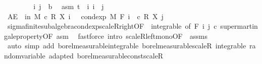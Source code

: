 \begin{isabellebody}
%
\isadelimproof
%
\endisadelimproof
%
\isatagproof
{}\isamarkupfalse%
\isanewline
\ \ \isacommand{{\isacharbraceleft}{\kern0pt}}\isamarkupfalse%
\isanewline
\ \ \ \ \isamarkupfalse%
\ i\ j\ {\isacharcolon}{\kern0pt}{\isacharcolon}{\kern0pt}\ {\isacharprime}{\kern0pt}b\ \isamarkupfalse%
\ asm{\isacharcolon}{\kern0pt}\ {\isachardoublequoteopen}t\ {\isasymle}\ i{\isachardoublequoteclose}\ {\isachardoublequoteopen}i\ {\isasymle}\ j{\isachardoublequoteclose}\isanewline
\ \ \ \ \isamarkupfalse%
\ {\isachardoublequoteopen}AE\ {\isasymxi}\ in\ M{\isachardot}{\kern0pt}\ c\ {\isacharasterisk}{\kern0pt}\isactrlsub R\ X\ i\ {\isasymxi}\ {\isasymge}\ cond{\isacharunderscore}{\kern0pt}exp\ M\ {\isacharparenleft}{\kern0pt}F\ i{\isacharparenright}{\kern0pt}\ {\isacharparenleft}{\kern0pt}{\isasymlambda}{\isasymxi}{\isachardot}{\kern0pt}\ c\ {\isacharasterisk}{\kern0pt}\isactrlsub R\ X\ j\ {\isasymxi}{\isacharparenright}{\kern0pt}\ {\isasymxi}{\isachardoublequoteclose}\isanewline
\ \ \ \ \ \ \isamarkupfalse%
\ sigma{\isacharunderscore}{\kern0pt}finite{\isacharunderscore}{\kern0pt}subalgebra{\isachardot}{\kern0pt}cond{\isacharunderscore}{\kern0pt}exp{\isacharunderscore}{\kern0pt}scaleR{\isacharunderscore}{\kern0pt}right{\isacharbrackleft}{\kern0pt}OF\ {\isacharunderscore}{\kern0pt}\ integrable{\isacharcomma}{\kern0pt}\ of\ {\isachardoublequoteopen}F\ i{\isachardoublequoteclose}\ j\ c{\isacharbrackright}{\kern0pt}\ supermartingale{\isacharunderscore}{\kern0pt}property{\isacharbrackleft}{\kern0pt}OF\ asm{\isacharbrackright}{\kern0pt}\ \isamarkupfalse%
\ {\isacharparenleft}{\kern0pt}fastforce\ intro{\isacharbang}{\kern0pt}{\isacharcolon}{\kern0pt}\ scaleR{\isacharunderscore}{\kern0pt}left{\isacharunderscore}{\kern0pt}mono{\isacharbrackleft}{\kern0pt}OF\ {\isacharunderscore}{\kern0pt}\ assms{\isacharbrackright}{\kern0pt}{\isacharparenright}{\kern0pt}\isanewline
\ \ \isacommand{{\isacharbraceright}{\kern0pt}}\isamarkupfalse%
\isanewline
{}\isamarkupfalse%
\ {\isacharparenleft}{\kern0pt}auto\ simp\ add{\isacharcolon}{\kern0pt}\ borel{\isacharunderscore}{\kern0pt}measurable{\isacharunderscore}{\kern0pt}integrable\ borel{\isacharunderscore}{\kern0pt}measurable{\isacharunderscore}{\kern0pt}scaleR\ integrable\ random{\isacharunderscore}{\kern0pt}variable\ adapted\ borel{\isacharunderscore}{\kern0pt}measurable{\isacharunderscore}{\kern0pt}const{\isacharunderscore}{\kern0pt}scaleR{\isacharparenright}{\kern0pt}%
\endisatagproof
{\isafoldproof}%
%

\end{isabellebody}
